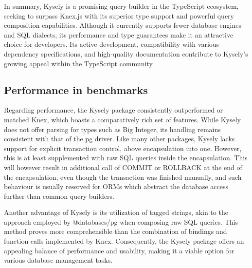 In summary, Kysely is a promising query builder in the TypeScript ecosystem,
seeking to surpass Knex.js with its superior type support and powerful query
composition capabilities. Although it currently supports fewer database engines
and SQL dialects, its performance and type guarantees make it an attractive
choice for developers. Its active development, compatibility with various
dependency specifications, and high-quality documentation contribute to Kysely's
growing appeal within the TypeScript community.

\subsection*{Performance in benchmarks}

Regarding performance, the Kysely package consistently outperformed or matched
Knex, which boasts a comparatively rich set of features. While Kysely does not
offer parsing for types such as Big Integer, its handling remains consistent
with that of the pg driver. Like many other packages, Kysely lacks support for
explicit transaction control, above encapsulation into one. However, this is at
least supplemented with raw SQL queries inside the encapsulation. This will
however result in additional call of COMMIT or ROLLBACK at the end of the
encapsulation, even though the transaction was finished manually, and such
behaviour is usually reserved for ORMs which abstract the database access
further than common query builders.

Another advantage of Kysely is its utilization of tagged strings, akin to the
approach employed by @databases/pg when composing raw SQL queries. This method
proves more comprehensible than the combination of bindings and function calls
implemented by Knex. Consequently, the Kysely package offers an appealing
balance of performance and usability, making it a viable option for various
database management tasks.
